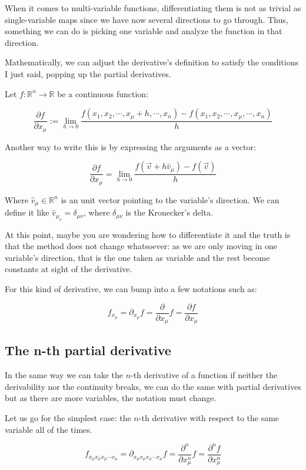 \documentclass[12pt]{article}
\begin{document}
	When it comes to multi-variable functions, differentiating them is not as trivial as single-variable maps since we have now several directions to go through. Thus, something we can do is picking one variable and analyze the function in that direction.
	
	Mathematically, we can adjust the derivative's definition to satisfy the conditions I just said, popping up the partial derivatives.
	
	Let $f : \mathbb{R}^n \to \mathbb{R}$ be a continuous function:
	
	\[
		\frac{\partial f}{\partial x_\mu}
		:= \lim_{h \to 0} \frac{f(x_1, x_2, \cdots, x_\mu + h, \cdots, x_n) - f(x_1, x_2, \cdots, x_\mu, \cdots, x_n)}{h}
	\]
	
	Another way to write this is by expressing the arguments as a vector:
	
	\[
		\frac{\partial f}{\partial x_\mu}
		= \lim_{h \to 0} \frac{f(\vec{v} + h\hat{v}_\mu) - f(\vec{v})}{h}
	\]
	
	Where $\hat{v}_\mu \in \mathbb{R}^n$ is an unit vector pointing to the variable's direction. We can define it like $\hat{v}_{\mu_\nu} = \delta_{\mu\nu}$, where $\delta_{\mu\nu}$ is the Kronecker's delta.
	
	At this point, maybe you are wondering how to differentiate it and the truth is that the method does not change whatsoever: as we are only moving in one variable's direction, that is the one taken as variable and the rest become constants at sight of the derivative.
	
	For this kind of derivative, we can bump into a few notations such as:
	
	\[
		f_{x_\mu}
		= \partial_{x_\mu} f
		= \frac{\partial}{\partial x_\mu} f
		= \frac{\partial f}{\partial x_\mu}
	\]
	
	\subsection{The n-th partial derivative}
	
	In the same way we can take the $n$-th derivative of a function if neither the derivability nor the continuity breaks, we can do the same with partial derivatives but as there are more variables, the notation must change.
	
	Let us go for the simplest case: the $n$-th derivative with respect to the same variable all of the times.
	
	\[
		f_{x_\mu x_\mu x_\mu \cdots x_\mu}
		= \partial_{x_\mu x_\mu x_\mu \cdots x_\mu} f
		= \frac{\partial^n}{\partial x_\mu^n} f
		= \frac{\partial^n f}{\partial x_\mu^n}
	\]
	
\end{document}
